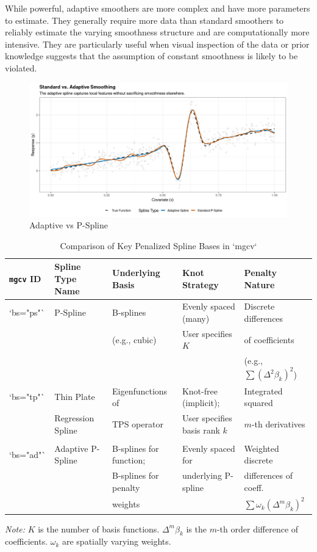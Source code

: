 \documentclass[11pt, a4paper]{article}
\begin{document}
While powerful, adaptive smoothers are more complex and have more parameters to estimate. They generally require more data than standard smoothers to reliably estimate the varying smoothness structure and are computationally more intensive. They are particularly useful when visual inspection of the data or prior knowledge suggests that the assumption of constant smoothness is likely to be violated.
\begin{figure}[h!]
 \centering
 \includegraphics[width=1\linewidth]{adaptive_spline.png}
 \caption{Adaptive vs P-Spline}
\end{figure}

\vspace{1em}
\begin{table}[h!]
\centering
\caption{Comparison of Key Penalized Spline Bases in `mgcv`}
\label{tab:spline_comparison}
\begin{tabular}{@{}lllll@{}}
\toprule
\textbf{\texttt{mgcv} ID} & \textbf{Spline Type Name} & \textbf{Underlying Basis} & \textbf{Knot Strategy} & \textbf{Penalty Nature} \\
\midrule
`bs="ps"` & P-Spline & B-splines & Evenly spaced (many) & Discrete differences \\
& & (e.g., cubic) & User specifies $K$ & of coefficients \\
& & & & (e.g., $\sum (\Delta^2 \beta_k)^2$) \\
\addlinespace
`bs="tp"` & Thin Plate & Eigenfunctions of & Knot-free (implicit); & Integrated squared \\
& Regression Spline & TPS operator & User specifies basis rank $k$ & $m$-th derivatives \\
& & & &  \\
\addlinespace
`bs="ad"` & Adaptive P-Spline & B-splines for function; & Evenly spaced for & Weighted discrete \\
& & B-splines for penalty & underlying P-spline & differences of coeff. \\
& & weights & & $\sum \omega_k (\Delta^m \beta_k)^2$ \\
\bottomrule
\end{tabular}
\par
\vspace{0.5em}
\textit{Note:} $K$ is the number of basis functions. $\Delta^m \beta_k$ is the $m$-th order difference of coefficients. $\omega_k$ are spatially varying weights.
\end{table}
\end{document}
